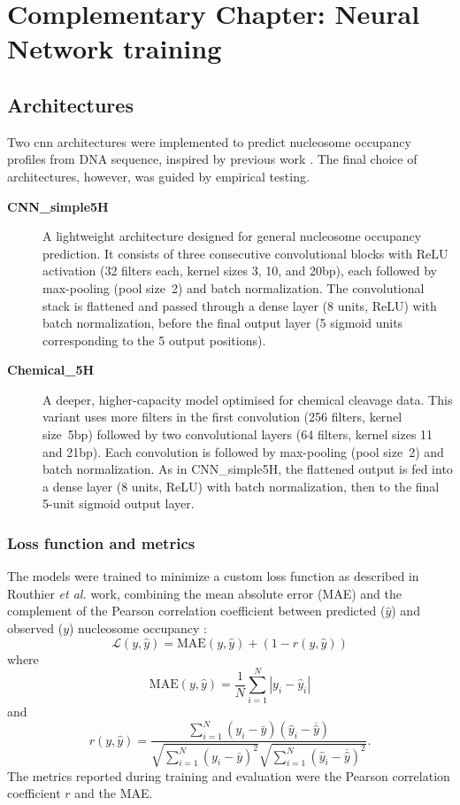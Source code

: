 \documentclass[11pt]{book}
\begin{document}
\chapter{Complementary Chapter: Neural Network training}
\label{appendix:architecture}
\section{Architectures}
Two \gls{cnn} architectures were implemented to predict nucleosome occupancy profiles from DNA sequence, inspired by previous work \cite{routhier_genome-wide_2021}. The final choice of architectures, however, was guided by empirical testing.
\begin{description}
    \item[\textbf{CNN\_simple5H}] A lightweight architecture designed for general nucleosome occupancy prediction. It consists of three consecutive convolutional blocks with ReLU activation (32 filters each, kernel sizes 3, 10, and 20bp), each followed by max-pooling (pool size~2) and batch normalization. The convolutional stack is flattened and passed through a dense layer (8 units, ReLU) with batch normalization, before the final output layer (5 sigmoid units corresponding to the 5 output positions).
    
    \item[\textbf{Chemical\_5H}] A deeper, higher-capacity model optimised for chemical cleavage data. This variant uses more filters in the first convolution (256 filters, kernel size~5bp) followed by two convolutional layers (64 filters, kernel sizes 11 and 21bp). Each convolution is followed by max-pooling (pool size~2) and batch normalization. As in CNN\_simple5H, the flattened output is fed into a dense layer (8 units, ReLU) with batch normalization, then to the final 5-unit sigmoid output layer.
\end{description}

\subsection{Loss function and metrics}
The models were trained to minimize a custom loss function as described in Routhier \textit{et al.} work, combining the mean absolute error (MAE) and the complement of the Pearson correlation coefficient between predicted ($\hat{y}$) and observed ($y$) nucleosome occupancy \cite{routhier_genome-wide_2021}:
\begin{equation}
    \mathcal{L}(y, \hat{y}) = \mathrm{MAE}(y, \hat{y}) + \left( 1 - r(y, \hat{y}) \right)
\end{equation}
where
\begin{equation}
    \mathrm{MAE}(y, \hat{y}) = \frac{1}{N} \sum_{i=1}^N |y_i - \hat{y}_i|
\end{equation}
and
\begin{equation}
    r(y, \hat{y}) = \frac{\sum_{i=1}^N (y_i - \bar{y})(\hat{y}_i - \overline{\hat{y}})}
    {\sqrt{\sum_{i=1}^N (y_i - \bar{y})^2} \sqrt{\sum_{i=1}^N (\hat{y}_i - \overline{\hat{y}})^2}} .
\end{equation}
The metrics reported during training and evaluation were the Pearson correlation coefficient $r$ and the MAE.
\end{document}

